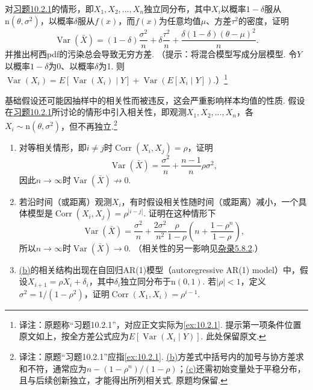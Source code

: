 \begin{exercise}\label{exercise:10.18}
对\hyperref[ex:10.2.1]{习题10.2.1}的情形，即$X_1,X_2,\ldots,X_n$独立同分布，其中$X_i$以概率$1-\delta$服从$\mathrm n(\theta,\sigma^2)$，以概率$\delta$服从$f(x)$，而$f(x)$为任意均值$\mu$、方差$\tau^2$的密度，证明
$$\operatorname{Var}(\bar X)=(1-\delta)\frac{\sigma^2}n+\delta\frac{\tau^2}n+\frac{\delta(1-\delta)(\theta-\mu)^2}n.$$
并推出柯西pdf的污染总会导致无穷方差. （提示：将混合模型写成分层模型. 令$Y$以概率$1-\delta$为0、以概率$\delta$为1. 则$\operatorname{Var}(X_i)=E[\operatorname{Var}(X_i)\mid Y]+\operatorname{Var}(E[X_i\mid Y])$.）\footnote{译注：原题称“习题10.2.1”，对应正文实际为\autoref{ex:10.2.1}. 提示第一项条件位置原文如上，按全方差公式应为$E[\operatorname{Var}(X_i\mid Y)]$. 此处保留原文.}
\end{exercise}

\begin{exercise}\label{exercise:10.19}
基础假设还可能因抽样中的相关性而被违反，这会严重影响样本均值的性质. 假设在\hyperref[ex:10.2.1]{习题10.2.1}所讨论的情形中引入相关性，即观测$X_1,X_2,\ldots,X_n$，各$X_i\sim\mathrm n(\theta,\sigma^2)$，但不再独立.\footnote{译注：原题“习题10.2.1”应指\autoref{ex:10.2.1}. \hyperref[item:10.19.b]{(b)}方差式中括号内的加号与协方差求和不符，通常应为$n-(1-\rho^n)/(1-\rho)$；\hyperref[itm:exercise:10.19:c]{(c)}还需初始变量处于平稳分布，且与后续创新独立，才能得出所列相关式. 原题均保留.}
\begin{enumerate}[label=(\alph*)]
\item 对等相关情形，即$i\ne j$时$\operatorname{Corr}(X_i,X_j)=\rho$，证明
$$\operatorname{Var}(\bar X)=\frac{\sigma^2}n+\frac{n-1}n\rho\sigma^2,$$
因此$n\to\infty$时$\operatorname{Var}(\bar X)\not\to0$.
\item\label{item:10.19.b} 若沿时间（或距离）观测$X_i$，有时假设相关性随时间（或距离）减小，一个具体模型是$\operatorname{Corr}(X_i,X_j)=\rho^{|i-j|}$. 证明在这种情形下
$$\operatorname{Var}(\bar X)=\frac{\sigma^2}n+\frac{2\sigma^2}{n^2}\frac\rho{1-\rho}\left(n+\frac{1-\rho^n}{1-\rho}\right),$$
所以$n\to\infty$时$\operatorname{Var}(\bar X)\to0$. （相关性的另一影响见\hyperref[sec:5.8.2]{杂录5.8.2}.）
\item{}\label{itm:exercise:10.19:c} \hyperref[item:10.19.b]{(b)}的相关结构出现在自回归AR(1)模型（autoregressive AR(1) model）中，假设$X_{i+1}=\rho X_i+\delta_i$，其中$\delta_i$独立同分布于$\mathrm n(0,1)$. 若$|\rho|<1$，定义$\sigma^2=1/(1-\rho^2)$，证明$\operatorname{Corr}(X_1,X_i)=\rho^{i-1}$.
\end{enumerate}
\end{exercise}

